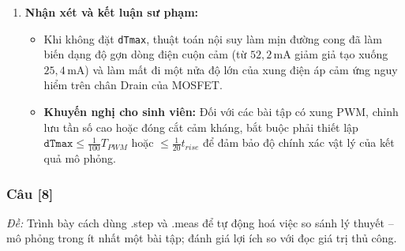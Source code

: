 \documentclass[12pt,a4paper]{article}
\newcommand{\cauhoi}[2]{%
  \subsubsection{Câu [#1]}
  \begin{tcolorbox}[colback=white,colframe=guidegray!70,boxrule=0.4pt,arc=1pt,left=5pt,right=5pt,top=2pt,bottom=2pt]
  \small\textit{Đề:} #2
  \end{tcolorbox}
  \par\vspace{4pt}}
\begin{document}
\begin{enumerate}[label=(\alph*)]
  \item \textbf{Nhận xét và kết luận sư phạm:}
  \begin{itemize}
    \item Khi không đặt \texttt{dTmax}, thuật toán nội suy làm mịn đường cong đã làm biến dạng độ gợn dòng điện cuộn cảm (từ $52{,}2\,\text{mA}$ giảm giả tạo xuống $25{,}4\,\text{mA}$) và làm mất đi một nửa độ lớn của xung điện áp cảm ứng nguy hiểm trên chân Drain của MOSFET.
    \item \textbf{Khuyến nghị cho sinh viên:} Đối với các bài tập có xung PWM, chỉnh lưu tần số cao hoặc đóng cắt cảm kháng, bắt buộc phải thiết lập $\texttt{dTmax} \le \frac{1}{100} T_{PWM}$ hoặc $\le \frac{1}{20} t_{rise}$ để đảm bảo độ chính xác vật lý của kết quả mô phỏng.
  \end{itemize}
\end{enumerate}

\cauhoi{8}{Trình bày cách dùng .step và .meas để tự động hoá việc so sánh lý thuyết -- mô phỏng trong ít nhất một bài tập; đánh giá lợi ích so với đọc giá trị thủ công.}
\end{document}
